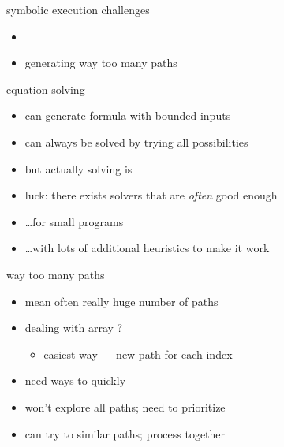 
\begin{frame}{symbolic execution challenges}
    \begin{itemize}
        \item {}
        \item generating way too many paths
    \end{itemize}
\end{frame}

\begin{frame}{equation solving}
    \begin{itemize}
        \item can generate formula with bounded inputs
        \item can always be solved by trying all possibilities
            \vspace{.5cm}
        \item but actually solving is 
        \item luck: there exists solvers that are \textit{often} good enough
        \item \ldots for small programs
        \item \ldots with lots of additional heuristics to make it work
    \end{itemize}
\end{frame}
        
\begin{frame}{way too many paths}
    \begin{itemize}
        \item {} mean often really huge number of paths
        \item dealing with array ?
            \begin{itemize}
                \item easiest way --- new path for each index
            \end{itemize}
        \item need ways to quickly 
        \item won't explore all paths; need to prioritize
        \item can try to similar paths; process together
    \end{itemize}
\end{frame}


